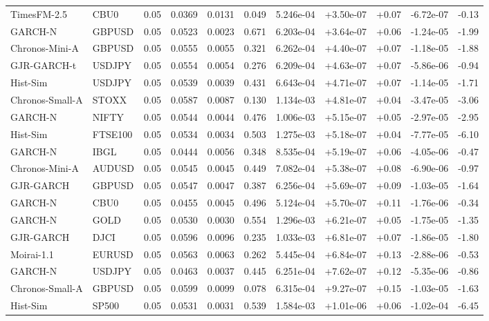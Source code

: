 \begin{tabular}{llrrrrrrrrr}
TimesFM-2.5 & CBU0 & 0.05 & 0.0369 & 0.0131 & 0.049 & 5.246e-04 & +3.50e-07 & +0.07 & -6.72e-07 & -0.13 \\
GARCH-N & GBPUSD & 0.05 & 0.0523 & 0.0023 & 0.671 & 6.203e-04 & +3.64e-07 & +0.06 & -1.24e-05 & -1.99 \\
Chronos-Mini-A & GBPUSD & 0.05 & 0.0555 & 0.0055 & 0.321 & 6.262e-04 & +4.40e-07 & +0.07 & -1.18e-05 & -1.88 \\
GJR-GARCH-t & USDJPY & 0.05 & 0.0554 & 0.0054 & 0.276 & 6.209e-04 & +4.63e-07 & +0.07 & -5.86e-06 & -0.94 \\
Hist-Sim & USDJPY & 0.05 & 0.0539 & 0.0039 & 0.431 & 6.643e-04 & +4.71e-07 & +0.07 & -1.14e-05 & -1.71 \\
Chronos-Small-A & STOXX & 0.05 & 0.0587 & 0.0087 & 0.130 & 1.134e-03 & +4.81e-07 & +0.04 & -3.47e-05 & -3.06 \\
GARCH-N & NIFTY & 0.05 & 0.0544 & 0.0044 & 0.476 & 1.006e-03 & +5.15e-07 & +0.05 & -2.97e-05 & -2.95 \\
Hist-Sim & FTSE100 & 0.05 & 0.0534 & 0.0034 & 0.503 & 1.275e-03 & +5.18e-07 & +0.04 & -7.77e-05 & -6.10 \\
GARCH-N & IBGL & 0.05 & 0.0444 & 0.0056 & 0.348 & 8.535e-04 & +5.19e-07 & +0.06 & -4.05e-06 & -0.47 \\
Chronos-Mini-A & AUDUSD & 0.05 & 0.0545 & 0.0045 & 0.449 & 7.082e-04 & +5.38e-07 & +0.08 & -6.90e-06 & -0.97 \\
GJR-GARCH & GBPUSD & 0.05 & 0.0547 & 0.0047 & 0.387 & 6.256e-04 & +5.69e-07 & +0.09 & -1.03e-05 & -1.64 \\
GARCH-N & CBU0 & 0.05 & 0.0455 & 0.0045 & 0.496 & 5.124e-04 & +5.70e-07 & +0.11 & -1.76e-06 & -0.34 \\
GARCH-N & GOLD & 0.05 & 0.0530 & 0.0030 & 0.554 & 1.296e-03 & +6.21e-07 & +0.05 & -1.75e-05 & -1.35 \\
GJR-GARCH & DJCI & 0.05 & 0.0596 & 0.0096 & 0.235 & 1.033e-03 & +6.81e-07 & +0.07 & -1.86e-05 & -1.80 \\
Moirai-1.1 & EURUSD & 0.05 & 0.0563 & 0.0063 & 0.262 & 5.445e-04 & +6.84e-07 & +0.13 & -2.88e-06 & -0.53 \\
GARCH-N & USDJPY & 0.05 & 0.0463 & 0.0037 & 0.445 & 6.251e-04 & +7.62e-07 & +0.12 & -5.35e-06 & -0.86 \\
Chronos-Small-A & GBPUSD & 0.05 & 0.0599 & 0.0099 & 0.078 & 6.315e-04 & +9.27e-07 & +0.15 & -1.03e-05 & -1.63 \\
Hist-Sim & SP500 & 0.05 & 0.0531 & 0.0031 & 0.539 & 1.584e-03 & +1.01e-06 & +0.06 & -1.02e-04 & -6.45 \\

\end{tabular}
